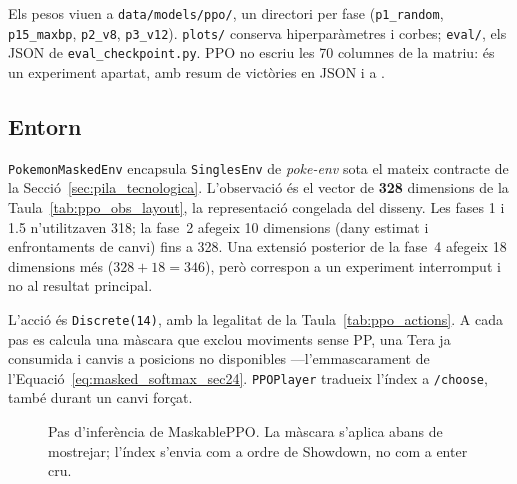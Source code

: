 Els pesos viuen a \texttt{data/models/ppo/}, un directori per fase (\texttt{p1\_random}, \texttt{p15\_maxbp}, \texttt{p2\_v8}, \texttt{p3\_v12}). \texttt{plots/} conserva hiperparàmetres i corbes; \texttt{eval/}, els JSON de \texttt{eval\_checkpoint.py}. PPO no escriu les 70 columnes de la matriu: és un experiment apartat, amb resum de victòries en JSON i a .

\subsection{Entorn}

\texttt{PokemonMaskedEnv} encapsula \texttt{SinglesEnv} de \textit{poke-env} sota el mateix contracte de la Secció~\ref{sec:pila_tecnologica}. L'observació és el vector de \textbf{328} dimensions de la Taula~\ref{tab:ppo_obs_layout}, la representació congelada del disseny. Les fases 1 i 1.5 n'utilitzaven 318; la fase~2 afegeix 10 dimensions (dany estimat i enfrontaments de canvi) fins a 328. Una extensió posterior de la fase~4 afegeix 18 dimensions més ($328+18=346$), però correspon a un experiment interromput i no al resultat principal.



L'acció és \texttt{Discrete(14)}, amb la legalitat de la Taula~\ref{tab:ppo_actions}. A cada pas es calcula una màscara que exclou moviments sense PP, una Tera ja consumida i canvis a posicions no disponibles ---l'emmascarament de l'Equació~\ref{eq:masked_softmax_sec24}. \texttt{PPOPlayer} tradueix l'índex a \texttt{/choose}, també durant un canvi forçat.



\begin{figure}[htbp]
    \centering
    \caption{Pas d'inferència de MaskablePPO. La màscara s'aplica abans de mostrejar; l'índex s'envia com a ordre de Showdown, no com a enter cru.}
    \label{fig:ppo_infer}
\end{figure}

